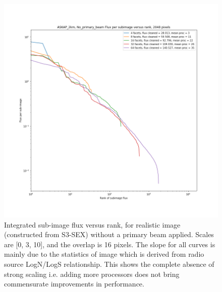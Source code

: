 \documentclass[11pt,a4paper,variablewidth]{article}
\begin{document}
\begin{figure}[H]
  \centering
  \includegraphics[width=\textwidth]{./pngs/fluxes_No_primary_beam_ASKAP_2km_2048.png}
  \caption{Integrated sub-image flux versus rank, for realistic image (constructed from S3-SEX) without a primary beam applied. Scales are [0, 3, 10], and the overlap is 16 pixels. The slope for all curves is mainly due to the statistics of image which is derived from radio source LogN/LogS relationship. This shows the complete absence of strong scaling i.e. adding more processors does not bring commensurate improvements in performance.}
  \label{fig:fluxes_without_pb}
\end{figure}
\end{document}
